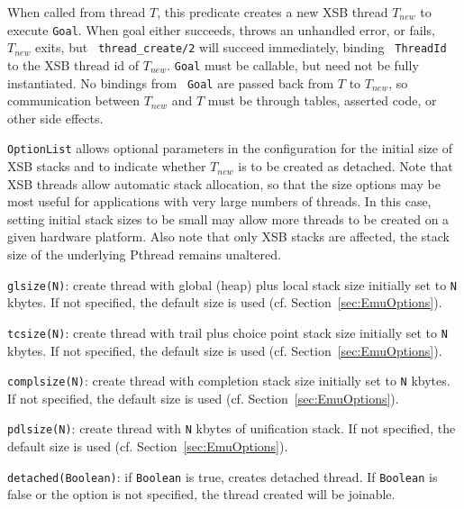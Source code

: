 \begin{description}

%
When called from thread $T$, this predicate creates a new XSB thread
$T_{new}$ to execute {\tt Goal}.  When goal either succeeds, throws an
unhandled error, or fails, $T_{new}$ exits, but {\tt
  thread\_create/2} will succeed immediately, binding {\tt
  ThreadId} to the XSB thread id of $T_{new}$.  {\tt Goal} must be
callable, but need not be fully instantiated.  No bindings from {\tt
  Goal} are passed back from $T$ to $T_{new}$, so communication
between $T_{new}$ and $T$ must be through tables, asserted code, or
other side effects.

{\tt OptionList} allows optional parameters in the configuration for
the initial size of XSB stacks and to indicate whether $T_{new}$ is to
be created as detached.  Note that XSB threads allow automatic stack
allocation, so that the size options may be most useful for
applications with very large numbers of threads.  In this case,
setting initial stack sizes to be small may allow more threads to be
created on a given hardware platform.  Also note that only XSB stacks
are affected, the stack size of the underlying Pthread remains
unaltered.
%
\bi
\item {\tt glsize(N)}: create thread with global (heap) plus local
  stack size initially set to {\tt N} kbytes.  If not specified, the
  default size is used (cf. Section~\ref{sec:EmuOptions}).
%
\item {\tt tcsize(N)}: create thread with trail plus choice point 
  stack size initially set to {\tt N} kbytes.  If not specified, the
  default size is used (cf. Section~\ref{sec:EmuOptions}).
%
\item {\tt complsize(N)}: create thread with completion
  stack size initially set to {\tt N} kbytes. If not specified, the
  default size is used (cf. Section~\ref{sec:EmuOptions}).
%
\item {\tt pdlsize(N)}: create thread with {\tt N} kbytes of
  unification stack.  If not specified, the
  default size is used (cf. Section~\ref{sec:EmuOptions}).
%
\item {\tt detached(Boolean)}: if {\tt Boolean} is true, creates
  detached thread.  If {\tt Boolean} is false or the option is not
  specified, the thread created will be joinable.  
\ei


\end{description}
